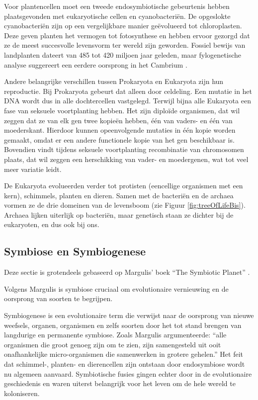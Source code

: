 \documentclass[
  11pt,
]{book}
\begin{document}
Voor plantencellen moet een tweede endosymbiotische gebeurtenis hebben plaatsgevonden met eukaryotische cellen en cyanobacteriën. De opgeslokte cyanobacteriën zijn op een vergelijkbare manier geëvolueerd tot chloroplasten. Deze geven planten het vermogen tot fotosynthese en hebben ervoor gezorgd dat ze de meest succesvolle levensvorm ter wereld zijn geworden. Fossiel bewijs van landplanten dateert van 485 tot 420 miljoen jaar geleden, maar fylogenetische analyse suggereert een eerdere oorsprong in het Cambrium \citep{StrotherFoster2021}.

Andere belangrijke verschillen tussen Prokaryota en Eukaryota zijn hun reproductie. Bij Prokaryota gebeurt dat alleen door celdeling. Een mutatie in het DNA wordt dus in alle dochtercellen vastgelegd. Terwijl bijna alle Eukaryota een fase van seksuele voortplanting hebben. Het zijn diploïde organismen, dat wil zeggen dat ze van elk gen twee kopieën hebben, één van vaders- en één van moederskant. Hierdoor kunnen opeenvolgende mutaties in één kopie worden gemaakt, omdat er een andere functionele kopie van het gen beschikbaar is. Bovendien vindt tijdens seksuele voortplanting recombinatie van chromosomen plaats, dat wil zeggen een herschikking van vader- en moedergenen, wat tot veel meer variatie leidt.

De Eukaryota evolueerden verder tot protisten (eencellige organismen met een kern), schimmels, planten en dieren. Samen met de bacteriën en de archaea vormen ze de drie domeinen van de levensboom (zie Figuur \ref{fig:treeOfLifeBis}). Archaea lijken uiterlijk op bacteriën, maar genetisch staan ze dichter bij de eukaryoten, en dus ook bij ons.

\subsection{Symbiose en Symbiogenese}\label{symbiose-en-symbiogenese}

Deze sectie is grotendeels gebaseerd op Margulis' boek ``The Symbiotic Planet'' \citep{margulis1999}.

Volgens Margulis is symbiose cruciaal om evolutionaire vernieuwing en de oorsprong van soorten te begrijpen.

Symbiogenese is een evolutionaire term die verwijst naar de oorsprong van nieuwe weefsels, organen, organismen en zelfs soorten door het tot stand brengen van langdurige en permanente symbiose. Zoals Margulis argumenteerde: ``alle organismen die groot genoeg zijn om te zien, zijn samengesteld uit ooit onafhankelijke micro-organismen die samenwerken in grotere gehelen.'' Het feit dat schimmel-, planten- en dierencellen zijn ontstaan door endosymbiose wordt nu algemeen aanvaard. Symbiotische fusies gingen echter door in de evolutionaire geschiedenis en waren uiterst belangrijk voor het leven om de hele wereld te koloniseren.
\end{document}
